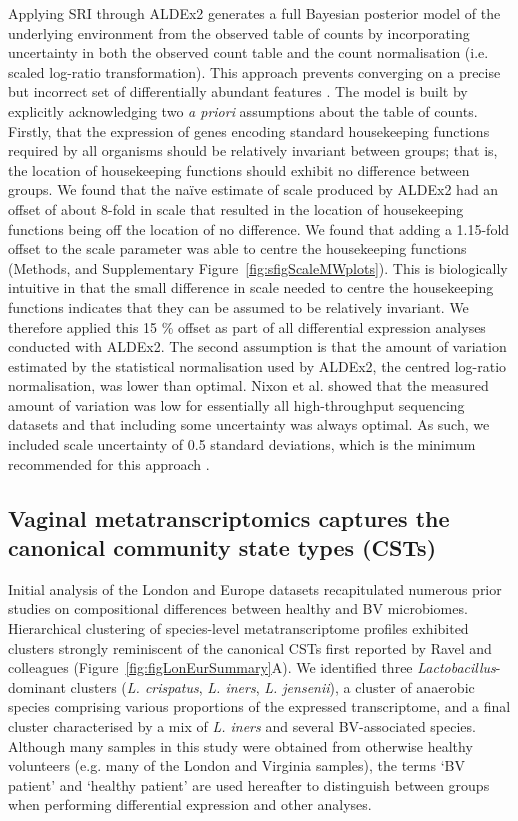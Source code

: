 \documentclass[sn-mathphys,Numbered]{sn-jnl}%
\begin{document}
Applying SRI through ALDEx2 generates a full Bayesian posterior model of the underlying environment from the observed table of counts by incorporating uncertainty in both the observed count table and the count normalisation (i.e. scaled log-ratio transformation). This approach prevents converging on a precise but incorrect set of differentially abundant features \citep{nixon2023scale}. The model is built by explicitly acknowledging two \textit{a priori} assumptions about the table of counts. Firstly, that the expression of genes encoding standard housekeeping functions required by all organisms should be relatively invariant between groups; that is, the location of housekeeping functions should exhibit no difference between groups. We found that the na\"{i}ve estimate of scale produced by ALDEx2 had an offset of about 8-fold in scale that resulted in the location of housekeeping functions being off the location of no difference. We found that adding a 1.15-fold offset to the scale parameter was able to centre the housekeeping functions (Methods, and Supplementary Figure~\ref{fig:sfigScaleMWplots}). This is biologically intuitive in that the small difference in scale needed to centre the housekeeping functions indicates that they can be assumed to be relatively invariant. We therefore applied this 15 \% offset as part of all differential expression analyses conducted with ALDEx2. The second assumption is that the amount of variation estimated by the statistical normalisation used by ALDEx2, the centred log-ratio normalisation, was lower than optimal. Nixon et al. \citep{nixon2023scale} showed that the measured amount of variation was low for essentially all high-throughput sequencing datasets and that including some uncertainty was always optimal. As such, we included scale uncertainty of 0.5 standard deviations, which is the minimum recommended for this approach \citep{gloorScale}.

\subsection{Vaginal metatranscriptomics captures the canonical community state types (CSTs)}\label{subsec:subsecCSTs}
Initial analysis of the London and Europe datasets recapitulated numerous prior studies on compositional differences between healthy and BV microbiomes. Hierarchical clustering of species-level metatranscriptome profiles exhibited clusters strongly reminiscent of the canonical CSTs first reported by Ravel and colleagues \cite{Ravel:2010, france_valencia_2020} (Figure~\ref{fig:figLonEurSummary}A). We identified three \textit{Lactobacillus}-dominant clusters (\textit{L. crispatus}, \textit{L. iners}, \textit{L. jensenii}), a cluster of anaerobic species comprising various proportions of the expressed transcriptome, and a final cluster characterised by a mix of \textit{L. iners} and several BV-associated species. Although many samples in this study were obtained from otherwise healthy volunteers (e.g. many of the London and Virginia samples), the terms `BV patient' and `healthy patient' are used hereafter to distinguish between groups when performing differential expression and other analyses.
\end{document}
